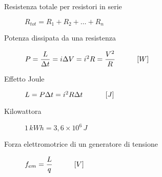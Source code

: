 \documentclass[a4paper,11pt,italian]{article}
\begin{document}
\begin{description}
  \item[Resistenza totale per resistori in serie] 
  $ R_{tot} = R_1 + R_2 + \ldots + R_n $
%

%   
  \item[Potenza dissipata da una resistenza]
  $ P = \dfrac{L}{\Delta t} = i \Delta V = i^2 R = \dfrac{V^2}{R} \hspace*{3em} [W] $
  
  \item[Effetto Joule] 
  $ L = P \Delta t = i^2 R \Delta t \hspace*{3em} \left[ J \right] $
  
  \item[Kilowattora] 
  $ 1 \, kWh = 3,6 \times 10^6 \, J $
  
  \item[Forza elettromotrice di un generatore di tensione] 
%   
  $ f_{em} = \dfrac{L}{q} \hspace*{3em} [V] $
  

\end{description}
\end{document}
